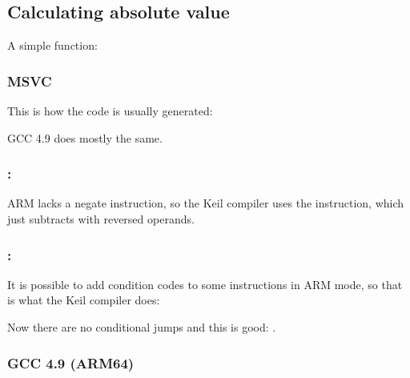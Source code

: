 \subsection{Calculating absolute value}
\label{sec:abs}

A simple function:



\subsubsection{\Optimizing MSVC}

This is how the code is usually generated:



GCC 4.9 does mostly the same.

\subsubsection{\OptimizingKeilVI: \ThumbMode}




ARM lacks a negate instruction, so the Keil compiler uses the  instruction, which just subtracts with reversed operands.

\subsubsection{\OptimizingKeilVI: \ARMMode}

It is possible to add condition codes to some instructions in ARM mode, so that is what the Keil compiler does:



Now there are no conditional jumps and this is good: .

\subsubsection{\NonOptimizing GCC 4.9 (ARM64)}



